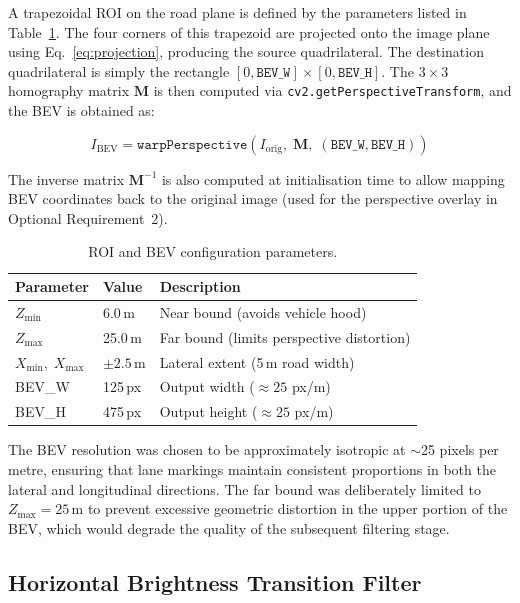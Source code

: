\documentclass[11pt,a4paper]{article}
\begin{document}
A trapezoidal ROI on the road plane is defined by the parameters listed in Table~\ref{tab:roi}. The four corners of this trapezoid are projected onto the image plane using Eq.~\eqref{eq:projection}, producing the source quadrilateral. The destination quadrilateral is simply the rectangle $[0, \texttt{BEV\_W}] \times [0, \texttt{BEV\_H}]$. The $3 \times 3$ homography matrix $\mathbf{M}$ is then computed via \texttt{cv2.getPerspectiveTransform}, and the BEV is obtained as:

\begin{equation}
    I_{\text{BEV}} = \texttt{warpPerspective}(I_{\text{orig}},\; \mathbf{M},\; (\texttt{BEV\_W}, \texttt{BEV\_H}))
\end{equation}

The inverse matrix $\mathbf{M}^{-1}$ is also computed at initialisation time to allow mapping BEV coordinates back to the original image (used for the perspective overlay in Optional Requirement~2).

\begin{table}[H]
\centering
\caption{ROI and BEV configuration parameters.}
\label{tab:roi}
\begin{tabular}{@{}lll@{}}
\toprule
\textbf{Parameter} & \textbf{Value} & \textbf{Description} \\
\midrule
$Z_{\min}$ & 6.0\,m & Near bound (avoids vehicle hood) \\
$Z_{\max}$ & 25.0\,m & Far bound (limits perspective distortion) \\
$X_{\min},\; X_{\max}$ & $\pm 2.5$\,m & Lateral extent (5\,m road width) \\
BEV\_W & 125\,px & Output width ($\approx 25$ px/m) \\
BEV\_H & 475\,px & Output height ($\approx 25$ px/m) \\
\bottomrule
\end{tabular}
\end{table}

The BEV resolution was chosen to be approximately isotropic at $\sim$25 pixels per metre, ensuring that lane markings maintain consistent proportions in both the lateral and longitudinal directions. The far bound was deliberately limited to $Z_{\max} = 25$\,m to prevent excessive geometric distortion in the upper portion of the BEV, which would degrade the quality of the subsequent filtering stage.


\subsection{Horizontal Brightness Transition Filter}
\label{sec:filter}
\end{document}
